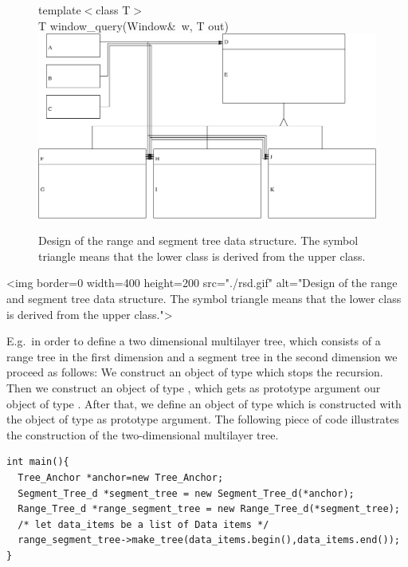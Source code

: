 \begin{ccTexOnly}
\begin{figure}
{{template$<$class T$>$\\
\hspace*{.2cm} T window\_query(Window$\&$~w, T out){}}}
\includegraphics[width=\textwidth,clip]{SearchStructures/rangesegmentdesign.eps}
\caption{\label{rangesegmentdesign} Design of the range and
  segment tree data structure. The symbol triangle means
that the lower class is derived from the upper class. }
\end{figure}
\end{ccTexOnly}

\begin{ccHtmlOnly}
    <img border=0 width=400 height=200 src="./rsd.gif" alt="Design of the range and
  segment tree data structure. The symbol triangle means
that the lower class is derived from the upper class.">
\end{ccHtmlOnly}

E.g.\ in order to define a two dimensional multilayer tree, which
consists of a range tree  in the first dimension and a segment
tree in the second dimension we proceed as follows: We construct
an object of type  which stops the
recursion. Then we construct an object of type ,
which gets as prototype argument our object of type
. After that, we define an object of type
 which is constructed with the object of type
 as prototype argument.
The following piece of code illustrates
the construction of the two-dimensional multilayer tree.

\begin{verbatim}
int main(){
  Tree_Anchor *anchor=new Tree_Anchor;
  Segment_Tree_d *segment_tree = new Segment_Tree_d(*anchor);
  Range_Tree_d *range_segment_tree = new Range_Tree_d(*segment_tree);
  /* let data_items be a list of Data items */
  range_segment_tree->make_tree(data_items.begin(),data_items.end());
}
\end{verbatim}

